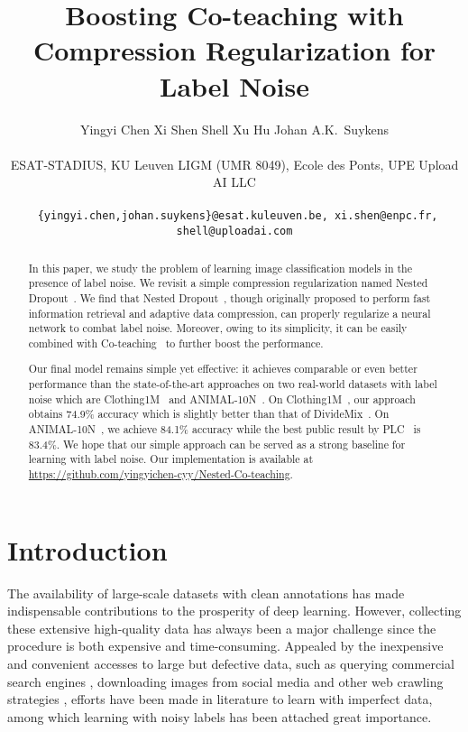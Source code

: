 \documentclass[final]{cvpr}
\begin{document}
\title{Boosting Co-teaching with Compression Regularization for Label Noise}

\author{Yingyi Chen 
\quad Xi Shen 
\quad Shell Xu Hu 
\quad Johan A.K.~Suykens 
\\
{\small 
ESAT-STADIUS, KU Leuven 
\quad 
LIGM (UMR 8049), Ecole des Ponts, UPE
\quad 
Upload AI LLC
\par}
\\
{\tt\small  
\{yingyi.chen,johan.suykens\}@esat.kuleuven.be,
xi.shen@enpc.fr,
shell@uploadai.com}
}






\maketitle


\begin{abstract}
   In this paper, we study the problem of learning image classification models in the presence of label noise. 
We revisit a simple compression regularization named Nested Dropout~\cite{rippel2014learning}. We find that Nested Dropout~\cite{rippel2014learning}, though originally proposed to perform fast information retrieval and adaptive data compression, can properly regularize a neural network to combat label noise. 
   Moreover, owing to its simplicity, it can be easily combined with Co-teaching~\cite{han2018co} to further boost the performance. 
   
   Our final model remains simple yet effective: it achieves comparable or even better performance than the state-of-the-art approaches on two real-world datasets with label noise which are Clothing1M~\cite{xiao2015learning} and ANIMAL-10N~\cite{song2019selfie}. 
   On Clothing1M~\cite{xiao2015learning}, our approach obtains 74.9\% accuracy which is slightly better than that of DivideMix~\cite{li2020dividemix}. 
   On ANIMAL-10N~\cite{song2019selfie}, we achieve 84.1\% accuracy while the best public result by PLC~\cite{zhang2021learning} is 83.4\%. 
   We hope that our simple approach can be served as a strong baseline for learning with label noise.
   Our implementation is available at \href{https://github.com/yingyichen-cyy/Nested-Co-teaching}{https://github.com/yingyichen-cyy/Nested-Co-teaching}.
\end{abstract}

\section{Introduction} \label{sec::intro}
The availability of large-scale datasets with clean annotations has made indispensable contributions to the prosperity of deep learning.
However, collecting these extensive high-quality data has always been a major challenge since the procedure is both expensive and time-consuming.
Appealed by the inexpensive and convenient accesses to large but  defective data, such as querying commercial search engines \cite{li2017webvision}, downloading images from social media \cite{mahajan2018exploring} and other web crawling strategies \cite{olston2010web}, efforts have been made in literature to learn with imperfect data, among which learning with noisy labels has been attached great importance. 
\end{document}
